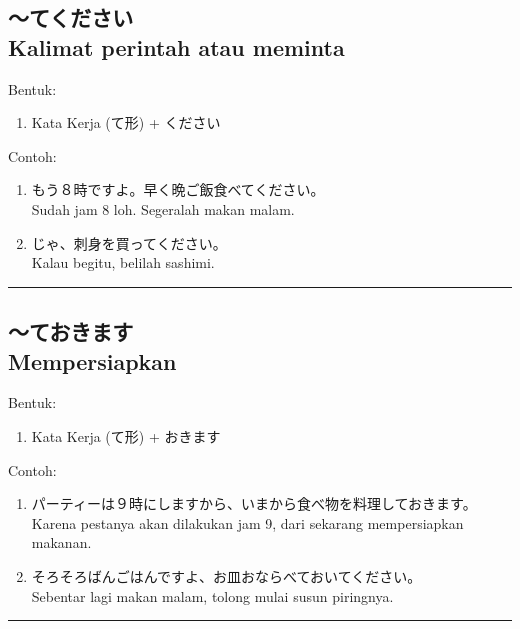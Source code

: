 \subsection*{
    ～てください \\
    Kalimat perintah atau meminta
}
Bentuk:
\begin{enumerate}
    \item Kata Kerja (て形) + ください
\end{enumerate}
Contoh: 
\begin{enumerate}
    \item もう８時ですよ。早く晩ご飯食べてください。
    \\ Sudah jam 8 loh. Segeralah makan malam.
    \item じゃ、刺身を買ってください。
    \\ Kalau begitu, belilah sashimi.
\end{enumerate}

\vspace{0.2cm}\hrule height 1pt\vspace{0.2cm}


\subsection*{
    ～ておきます \\
    Mempersiapkan
}
Bentuk:
\begin{enumerate}
    \item Kata Kerja (て形) + おきます
\end{enumerate}
Contoh: 
\begin{enumerate}
    \item パーティーは９時にしますから、いまから食べ物を料理しておきます。
    \\ Karena pestanya akan dilakukan jam 9, dari sekarang mempersiapkan makanan.
    \item そろそろばんごはんですよ、お皿おならべておいてください。
    \\ Sebentar lagi makan malam, tolong mulai susun piringnya.
\end{enumerate}

\vspace{0.2cm}\hrule height 1pt\vspace{0.2cm}